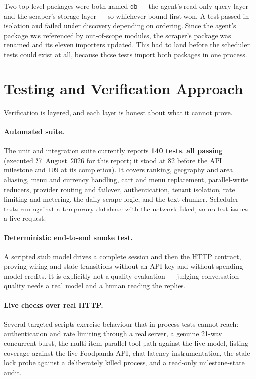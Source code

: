 \documentclass[11pt,a4paper]{article}
\newcommand{\code}[1]{\texttt{\small #1}}
\begin{document}
Two top-level packages were both named \code{db} --- the agent's read-only
query layer and the scraper's storage layer --- so whichever bound first won.
A test passed in isolation and failed under discovery depending on ordering.
Since the agent's package was referenced by out-of-scope modules, the scraper's
package was renamed and its eleven importers updated. This had to land before
the scheduler tests could exist at all, because those tests import both
packages in one process.

\section{Testing and Verification Approach}

Verification is layered, and each layer is honest about what it cannot prove.

\paragraph{Automated suite.} The unit and integration suite currently reports
\textbf{140 tests, all passing} (executed 27~August~2026 for this report; it
stood at 82 before the API milestone and 109 at its completion). It covers
ranking, geography and area aliasing, menu and currency handling, cart and
menu replacement, parallel-write reducers, provider routing and failover,
authentication, tenant isolation, rate limiting and metering, the daily-scrape
logic, and the text chunker. Scheduler tests run against a temporary database
with the network faked, so no test issues a live request.

\paragraph{Deterministic end-to-end smoke test.} A scripted stub model drives a
complete session and then the HTTP contract, proving wiring and state
transitions without an API key and without spending model credits. It is
explicitly not a quality evaluation --- judging conversation quality needs a
real model and a human reading the replies.

\paragraph{Live checks over real HTTP.} Several targeted scripts exercise
behaviour that in-process tests cannot reach: authentication and rate limiting
through a real server, a genuine 21-way concurrent burst, the multi-item
parallel-tool path against the live model, listing coverage against the live
Foodpanda API, chat latency instrumentation, the stale-lock probe against a
deliberately killed process, and a read-only milestone-state audit.
\end{document}
